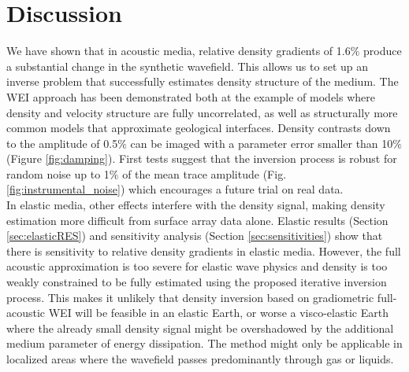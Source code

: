 \documentclass{article}
\begin{document}

	\section{Discussion}
	We have shown that in acoustic media, relative density gradients of 1.6$\%$ produce a substantial change in the synthetic wavefield. This allows us to set up an inverse problem that successfully estimates density structure of the medium. The WEI approach has been demonstrated both at the example of models where density and velocity structure are fully uncorrelated, as well as structurally more common models that approximate geological interfaces. Density contrasts down to the amplitude of  0.5$\%$ can be imaged with a parameter error smaller than 10$\%$ (Figure \ref{fig:damping}). First tests suggest that the inversion process is robust for random noise up to 1$\%$ of the mean trace amplitude (Fig. \ref{fig:instrumental_noise}) which encourages a future trial on real data.\\
	
	In elastic media, other effects interfere with the density signal, making density estimation more difficult from surface array data alone. Elastic results (Section \ref{sec:elasticRES}) and sensitivity analysis (Section \ref{sec:sensitivities}) show that there is sensitivity to relative density gradients in elastic media. However, the full acoustic approximation is too severe for elastic wave physics and density is too weakly constrained to be fully estimated using the proposed iterative inversion process. This makes it unlikely that density inversion based on gradiometric full-acoustic WEI will be feasible in an elastic Earth, or worse a visco-elastic Earth where the already small density signal might be overshadowed by the additional medium parameter of energy dissipation. The method might only be applicable in localized areas where the wavefield passes predominantly through gas or liquids.\\
	
\end{document}
